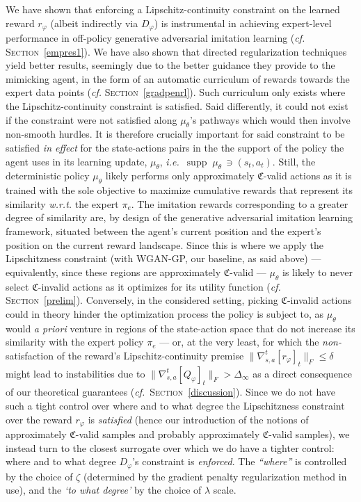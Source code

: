 We have shown that enforcing a Lipschitz-continuity constraint
on the learned reward $r_\varphi$ (albeit indirectly via $D_\varphi$)
is instrumental in achieving expert-level performance
in off-policy generative adversarial imitation learning
(\textit{cf.} \textsc{Section}~\ref{empres1}).
We have also shown that directed regularization techniques
yield better results,
seemingly due to the better guidance they provide to the mimicking agent,
in the form of an automatic curriculum of rewards towards the expert data points
(\textit{cf.} \textsc{Section}~\ref{gradpenrl}).
Such curriculum only exists where the Lipschitz-continuity constraint
is satisfied.
Said differently, it could not exist if the constraint were not satisfied along $\mu_\theta$'s pathways
which would then involve non-smooth hurdles.
It is therefore crucially important for said constraint to be satisfied \emph{in effect} for the
state-actions pairs in the the support of the policy the agent uses in its learning update,
$\mu_\theta$, \textit{i.e.}~$\operatorname{supp} \; \mu_\theta \, \ni (s_t, a_t)$.
Still, the deterministic policy $\mu_\theta$ likely performs only approximately $\mathfrak{C}$-valid
actions as it is trained with the sole objective to maximize cumulative rewards
that represent its similarity \textit{w.r.t.} the expert $\pi_e$.
The imitation rewards corresponding to a greater degree of similarity are,
by design of the generative adversarial imitation learning framework,
situated between the agent's current position and the expert's position
on the current reward landscape.
Since this is where we apply the Lipschitzness constraint (with WGAN-GP, our baseline, as said above)
--- equivalently, since these regions are approximately $\mathfrak{C}$-valid ---
$\mu_\theta$ is likely to never select $\mathfrak{C}$-invalid actions
as it optimizes for its utility function
(\textit{cf.} \textsc{Section}~\ref{prelim}).
Conversely, in the considered setting, picking $\mathfrak{C}$-invalid actions
could in theory hinder the optimization process the policy is subject to,
as $\mu_\theta$ would \textit{a priori} venture in regions of the state-action space
that do not increase its similarity with the expert policy $\pi_e$
--- or, at the very least, for which the \emph{non-}satisfaction of the reward's Lipschitz-continuity premise
$\lVert \nabla_{s,a}^t[r_\varphi]_t \rVert _F \leq \delta$
might lead to instabilities due to
$\lVert \nabla_{s,a}^t[Q_\varphi]_t \rVert _F > \Delta_\infty$
as a direct consequence of our theoretical guarantees
(\textit{cf.}~\textsc{Section}~\ref{discussion}).
Since we do not have such a tight control over where and to what degree
the Lipschitzness constraint over the reward $r_\varphi$ is \textit{satisfied}
(hence our introduction of the notions of approximately $\mathfrak{C}$-valid samples
and probably approximately $\mathfrak{C}$-valid samples),
we instead turn to the closest surrogate over which we do have a tighter control:
where and to what degree $D_\varphi$'s constraint is \emph{enforced}.
The \textit{``where''} is controlled by the choice of $\zeta$ (determined by the gradient penalty regularization
method in use),
and the \textit{`to what degree'} by the choice of $\lambda$ scale.

